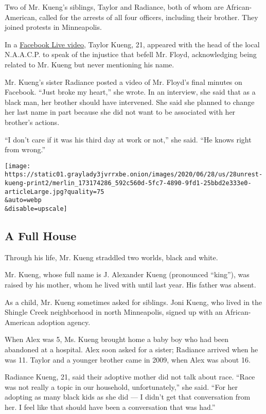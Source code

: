 Two of Mr. Kueng's siblings, Taylor and Radiance, both of whom are
African-American, called for the arrests of all four officers, including
their brother. They joined protests in Minneapolis.

In a
\href{https://www.facebookcorewwwi.onion/watch/live/?v=2793585684211644\&ref=watch_permalink}{Facebook
Live video}, Taylor Kueng, 21, appeared with the head of the local
N.A.A.C.P. to speak of the injustice that befell Mr. Floyd,
acknowledging being related to Mr. Kueng but never mentioning his name.

Mr. Kueng's sister Radiance posted a video of Mr. Floyd's final minutes
on Facebook. ``Just broke my heart,'' she wrote. In an interview, she
said that as a black man, her brother should have intervened. She said
she planned to change her last name in part because she did not want to
be associated with her brother's actions.

``I don't care if it was his third day at work or not,'' she said. ``He
knows right from wrong.''

\texttt{[image: https://static01.graylady3jvrrxbe.onion/images/2020/06/28/us/28unrest-kueng-print2/merlin\_173174286\_592c560d-5fc7-4890-9fd1-25bbd2e333e0-articleLarge.jpg?quality=75\\\&auto=webp\\\&disable=upscale]}

\hypertarget{a-full-house}{%
\subsection{A Full House}\label{a-full-house}}

Through his life, Mr. Kueng straddled two worlds, black and white.

Mr. Kueng, whose full name is J. Alexander Kueng (pronounced ``king''),
was raised by his mother, whom he lived with until last year. His father
was absent.

As a child, Mr. Kueng sometimes asked for siblings. Joni Kueng, who
lived in the Shingle Creek neighborhood in north Minneapolis, signed up
with an African-American adoption agency.

When Alex was 5, Ms. Kueng brought home a baby boy who had been
abandoned at a hospital. Alex soon asked for a sister; Radiance arrived
when he was 11. Taylor and a younger brother came in 2009, when Alex was
about 16.

Radiance Kueng, 21, said their adoptive mother did not talk about race.
``Race was not really a topic in our household, unfortunately,'' she
said. ``For her adopting as many black kids as she did --- I didn't get
that conversation from her. I feel like that should have been a
conversation that was had.''

